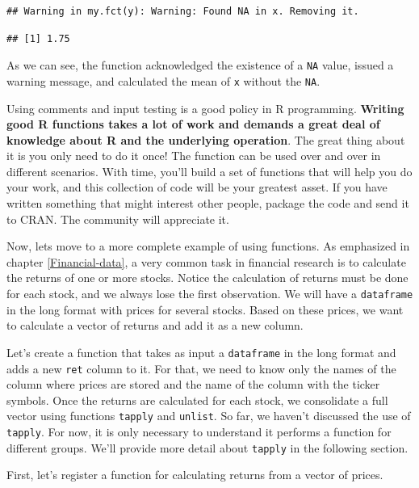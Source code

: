 \documentclass[11pt,]{book}
\begin{document}
\begin{verbatim}
## Warning in my.fct(y): Warning: Found NA in x. Removing it.
\end{verbatim}

\begin{verbatim}
## [1] 1.75
\end{verbatim}

As we can see, the function acknowledged the existence of a \texttt{NA}
value, issued a warning message, and calculated the mean of \texttt{x}
without the \texttt{NA}.

Using comments and input testing is a good policy in R programming.
\textbf{Writing good R functions takes a lot of work and demands a great
deal of knowledge about R and the underlying operation}. The great thing
about it is you only need to do it once! The function can be used over
and over in different scenarios. With time, you'll build a set of
functions that will help you do your work, and this collection of code
will be your greatest asset. If you have written something that might
interest other people, package the code and send it to CRAN. The
community will appreciate it.

Now, lets move to a more complete example of using functions. As
emphasized in chapter \ref{Financial-data}, a very common task in
financial research is to calculate the returns of one or more stocks.
Notice the calculation of returns must be done for each stock, and we
always lose the first observation. We will have a \texttt{dataframe} in
the long format with prices for several stocks. Based on these prices,
we want to calculate a vector of returns and add it as a new column.

Let's create a function that takes as input a \texttt{dataframe} in the
long format and adds a new \texttt{ret} column to it. For that, we need
to know only the names of the column where prices are stored and the
name of the column with the ticker symbols. Once the returns are
calculated for each stock, we consolidate a full vector using functions
\texttt{tapply} and \texttt{unlist}. So far, we haven't discussed the
use of \texttt{tapply}. For now, it is only necessary to understand it
performs a function for different groups. We'll provide more detail
about \texttt{tapply} in the following section. 

First, let's register a function for calculating returns from a vector
of prices.
\end{document}

